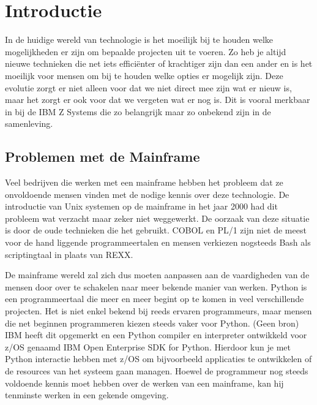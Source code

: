 
\section{Introductie}%
\label{sec:introductie}
In de huidige wereld van technologie is het moeilijk bij te houden welke mogelijkheden er zijn om bepaalde projecten uit te voeren. Zo heb je altijd nieuwe technieken die net iets efficiënter of krachtiger zijn dan een ander en is het moeilijk voor mensen om bij te houden welke opties er mogelijk zijn. Deze evolutie zorgt er niet alleen voor dat we niet direct mee zijn wat er nieuw is, maar het zorgt er ook voor dat we vergeten wat er nog is. Dit is vooral merkbaar in bij de IBM Z Systems die zo belangrijk maar zo onbekend zijn in de samenleving.

\subsection{Problemen met de Mainframe}
Veel bedrijven die werken met een mainframe hebben het probleem dat ze onvoldoende mensen vinden met de nodige kennis over deze technologie. De introductie van Unix systemen op de mainframe in het jaar 2000 \autocite{Mertic2020} had dit probleem wat verzacht maar zeker niet weggewerkt. De oorzaak van deze situatie is door de oude technieken die het gebruikt. COBOL en PL/1 zijn niet de meest voor de hand liggende programmeertalen en mensen verkiezen nogsteeds Bash als scriptingtaal in plaats van REXX. 

De mainframe wereld zal zich dus moeten aanpassen aan de vaardigheden van de mensen door over te schakelen naar meer bekende manier van werken. Python is een programmeertaal die meer en meer begint op te komen in veel verschillende projecten. Het is niet enkel bekend bij reeds ervaren programmeurs, maar mensen die net beginnen programmeren kiezen steeds vaker voor Python. (Geen bron)
IBM heeft dit opgemerkt en een Python compiler en interpreter ontwikkeld voor z/OS genaamd IBM Open Enterprise SDK for Python. Hierdoor kun je met Python interactie hebben met z/OS om bijvoorbeeld applicaties te ontwikkelen of de resources van het systeem gaan managen. Hoewel de programmeur nog steeds voldoende kennis moet hebben over de werken van een mainframe, kan hij tenminste werken in een gekende omgeving.

